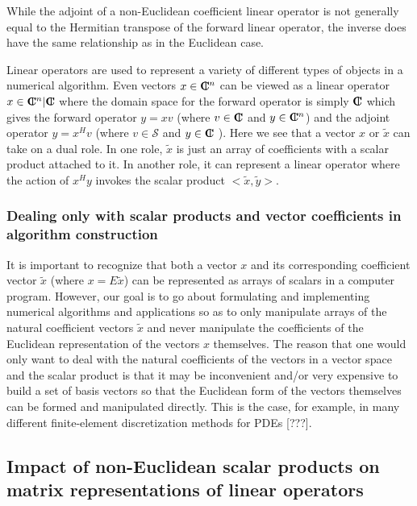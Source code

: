 While the adjoint of a non-Euclidean coefficient linear operator is not
generally equal to the Hermitian transpose of the forward linear operator, the
inverse does have the same relationship as in the Euclidean case.

Linear operators are used to represent a variety of different types of objects
in a numerical algorithm.  Even vectors $x\in\mbox{\textbf{C}}\hspace{-1.1ex}\mbox{l}\hspace{0.4ex}^n$ can be viewed as a
linear operator $x\in\mbox{\textbf{C}}\hspace{-1.1ex}\mbox{l}\hspace{0.4ex}^n|\mbox{\textbf{C}}\hspace{-1.1ex}\mbox{l}\hspace{0.4ex}$ where the domain space for the forward
operator is simply $\mbox{\textbf{C}}\hspace{-1.1ex}\mbox{l}\hspace{0.4ex}$ which gives the forward operator $y = x v$ (where
$v\in\mbox{\textbf{C}}\hspace{-1.1ex}\mbox{l}\hspace{0.4ex}$ and $y\in\mbox{\textbf{C}}\hspace{-1.1ex}\mbox{l}\hspace{0.4ex}^n$) and the adjoint operator $y = x^H v$ (where
$v\in\mathcal{S}$ and $y\in\mbox{\textbf{C}}\hspace{-1.1ex}\mbox{l}\hspace{0.4ex}$ ).  Here we see that a vector $x$ or
$\tilde{x}$ can take on a dual role.  In one role, $\tilde{x}$ is just an
array of coefficients with a scalar product attached to it.  In another role,
it can represent a linear operator where the action of $x^H y$ invokes the
scalar product $<\tilde{x},\tilde{y}>$.

\subsubsection{Dealing only with scalar products and vector coefficients in algorithm construction}

It is important to recognize that both a vector $x$ and its corresponding
coefficient vector $\tilde{x}$ (where $x = E\tilde{x}$) can be represented as
arrays of scalars in a computer program.  However, our goal is to go about
formulating and implementing numerical algorithms and applications so as to
only manipulate arrays of the natural coefficient vectors $\tilde{x}$ and
never manipulate the coefficients of the Euclidean representation of the
vectors $x$ themselves.  The reason that one would only want to deal with the
natural coefficients of the vectors in a vector space and the scalar product
is that it may be inconvenient and/or very expensive to build a set of basis
vectors so that the Euclidean form of the vectors themselves can be formed and
manipulated directly.  This is the case, for example, in many different
finite-element discretization methods for PDEs [???].

\subsection{Impact of non-Euclidean scalar products on matrix representations of linear operators}
\label{sec:matrix_representations_of_linear_operators}

